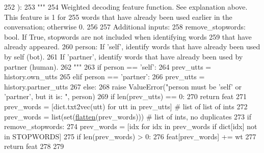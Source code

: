 \begin{DoxyCode}
252 ):
253     \textcolor{stringliteral}{"""}
254 \textcolor{stringliteral}{    Weighted decoding feature function. See explanation above. This feature is 1 for}
255 \textcolor{stringliteral}{    words that have already been used earlier in the conversation; otherwise 0.}
256 \textcolor{stringliteral}{}
257 \textcolor{stringliteral}{    Additional inputs:}
258 \textcolor{stringliteral}{      remove\_stopwords: bool. If True, stopwords are not included when identifying words}
259 \textcolor{stringliteral}{        that have already appeared.}
260 \textcolor{stringliteral}{      person: If 'self', identify words that have already been used by self (bot).}
261 \textcolor{stringliteral}{        If 'partner', identify words that have already been used by partner (human).}
262 \textcolor{stringliteral}{    """}
263     \textcolor{keywordflow}{if} person == \textcolor{stringliteral}{'self'}:
264         prev\_utts = history.own\_utts
265     \textcolor{keywordflow}{elif} person == \textcolor{stringliteral}{'partner'}:
266         prev\_utts = history.partner\_utts
267     \textcolor{keywordflow}{else}:
268         \textcolor{keywordflow}{raise} ValueError(\textcolor{stringliteral}{"person must be 'self' or 'partner', but it is: "}, person)
269     \textcolor{keywordflow}{if} len(prev\_utts) == 0:
270         \textcolor{keywordflow}{return} feat
271     prev\_words = [dict.txt2vec(utt) \textcolor{keywordflow}{for} utt \textcolor{keywordflow}{in} prev\_utts]  \textcolor{comment}{# list of list of ints}
272     prev\_words = list(set(\hyperlink{namespaceprojects_1_1controllable__dialogue_1_1controllable__seq2seq_1_1controls_a0db4b9d9584cef90aa2515a75e741774}{flatten}(prev\_words)))  \textcolor{comment}{# list of ints, no duplicates}
273     \textcolor{keywordflow}{if} remove\_stopwords:
274         prev\_words = [idx \textcolor{keywordflow}{for} idx \textcolor{keywordflow}{in} prev\_words \textcolor{keywordflow}{if} dict[idx] \textcolor{keywordflow}{not} \textcolor{keywordflow}{in} STOPWORDS]
275     \textcolor{keywordflow}{if} len(prev\_words) > 0:
276         feat[prev\_words] += wt
277     \textcolor{keywordflow}{return} feat
278 
279 
\end{DoxyCode}
\mbox{\label{namespaceprojects_1_1controllable__dialogue_1_1controllable__seq2seq_1_1controls_a0db4b9d9584cef90aa2515a75e741774}} 
